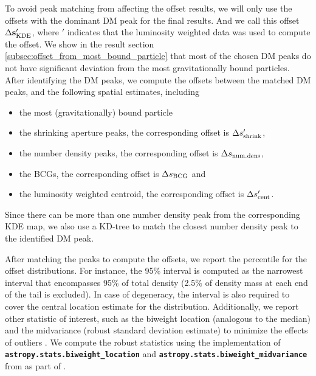 To avoid peak matching from affecting the offset results,
we will only use the offsets with the dominant DM peak for the final results.
And we call this offset $\Delta {\bf s}_{\rm KDE}'$, where $'$ indicates that the
luminosity weighted data was used to compute the offset. 
We show in the result section \ref{subsec:offset_from_most_bound_particle} 
that most of the chosen DM peaks
do not have significant deviation from the most gravitationally bound particles.
After identifying the DM peaks, we compute the 
offsets between the matched DM peaks, and the following spatial estimates, including 
\begin{itemize}
	\item the most (gravitationally) bound particle 
	\item the shrinking aperture peaks, the corresponding offset is $\Delta s_{\rm
		shrink}'$, 
	\item the number density peaks, the corresponding offset is $\Delta s_{\rm
		num.dens}$, 
	\item the BCGs, the corresponding offset is $\Delta s_{\rm BCG}$ and
\item the luminosity weighted centroid, the corresponding offset is $\Delta
	s_{\rm cent}'$.
\end{itemize}
Since there can be more than one number density peak from the corresponding KDE
map, we also use a KD-tree to match the closest number density peak to the 
identified DM peak.

After matching the peaks to compute the offsets, 
we report the percentile for the offset distributions.
For instance, the 95\% interval is computed as the narrowest interval that encompasses
95\% of total density (2.5\% of density mass at each end of the tail is
excluded). In case of degeneracy, the interval is also required to cover the 
central location estimate for the distribution.
Additionally, we report other statistic of interest, such as the biweight 
location (analogous to the median)
and the midvariance (robust standard deviation
estimate) to minimize the effects of outliers \citep{Beers90}. 
We compute the robust statistics using the 
implementation of {\bf \texttt{astropy.stats.biweight\_location}}
and {\bf \texttt{astropy.stats.biweight\_midvariance}}
from \cite{astropy} as part of {}. 

